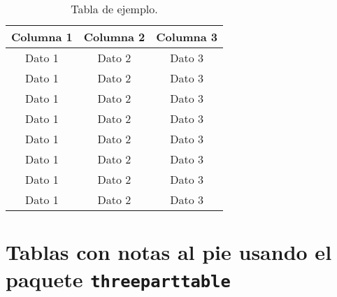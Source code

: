 \begin{table}[!ht]
  \caption{Tabla de ejemplo.}
  \centering
  \begin{tabular}{ccc}

    \toprule
    \textbf{Columna 1} & \textbf{Columna 2} & \textbf{Columna 3}\\
    \midrule
    Dato 1             & Dato 2             & Dato 3            \\
    Dato 1             & Dato 2             & Dato 3            \\
    Dato 1             & Dato 2             & Dato 3            \\
    Dato 1             & Dato 2             & Dato 3            \\
    Dato 1             & Dato 2             & Dato 3            \\
    Dato 1             & Dato 2             & Dato 3            \\
    Dato 1             & Dato 2             & Dato 3            \\
    Dato 1             & Dato 2             & Dato 3            \\
    \bottomrule

  \end{tabular}
  \label{tab:ejemplo1}
\end{table}

\lipsum[10]

\section{Tablas con notas al pie usando el paquete \texttt{threeparttable}}
\lipsum[11]


